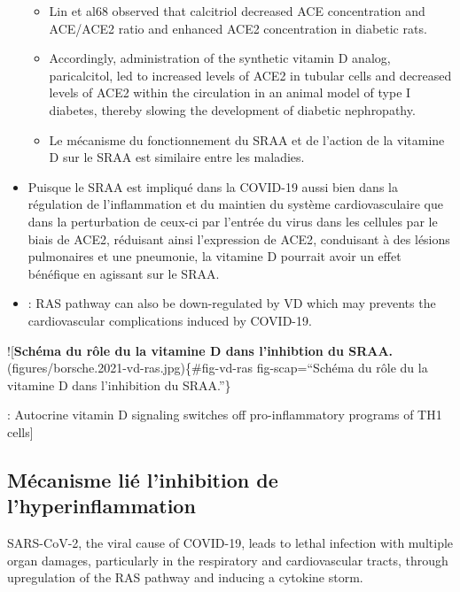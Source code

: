 \documentclass[
  a4paper,
  DIV=11,
  numbers=noendperiod,
  listof=totoc]{scrreprt}
\providecommand{\tightlist}{%
  \setlength{\itemsep}{0pt}\setlength{\parskip}{0pt}}\usepackage{longtable,booktabs,array}
\begin{document}
\begin{itemize}
  \begin{itemize}
  \item
    Lin et al68 observed that calcitriol decreased ACE concentration and
    ACE/ACE2 ratio and enhanced ACE2 concentration in diabetic rats.
  \item
    Accordingly, administration of the synthetic vitamin D analog,
    paricalcitol, led to increased levels of ACE2 in tubular cells and
    decreased levels of ACE2 within the circulation in an animal model
    of type I diabetes, thereby slowing the development of diabetic
    nephropathy.
  \item
    Le mécanisme du fonctionnement du SRAA et de l'action de la vitamine
    D sur le SRAA est similaire entre les maladies.
  \end{itemize}
\item
  Puisque le \ac{SRAA} est impliqué dans la COVID-19 aussi bien dans la
  régulation de l'inflammation et du maintien du système
  cardiovasculaire que dans la perturbation de ceux-ci par l'entrée du
  virus dans les cellules par le biais de \ac{ACE2}, réduisant ainsi
  l'expression de \ac{ACE2}, conduisant à des lésions pulmonaires et une
  pneumonie, la vitamine D pourrait avoir un effet bénéfique en agissant
  sur le \ac{SRAA}.
\end{itemize}

\autocite{Mahdavi.2020}

\begin{itemize}
\tightlist
\item
  \textcite{Shiravi.2022} : RAS pathway can also be down-regulated by VD
  which may prevents the cardiovascular complications induced by
  COVID-19.
\end{itemize}

!{[}\textbf{Schéma du rôle du la vitamine D dans l'inhibtion du
SRAA.}(figures/borsche.2021-vd-ras.jpg)\{\#fig-vd-ras fig-scap=``Schéma
du rôle du la vitamine D dans l'inhibition du SRAA.''\}

\autocite{Chauss.2022} : Autocrine vitamin D signaling switches off
pro-inflammatory programs of TH1 cells{]}

\subsection{Mécanisme lié l'inhibition de
l'hyperinflammation}\label{muxe9canisme-liuxe9-linhibition-de-lhyperinflammation}

SARS-CoV-2, the viral cause of COVID-19, leads to lethal infection with
multiple organ damages, particularly in the respiratory and
cardiovascular tracts, through upregulation of the RAS pathway and
inducing a cytokine storm.
\end{document}
